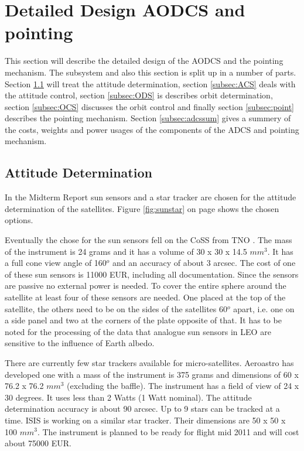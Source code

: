 \section{Detailed Design AODCS and pointing}
\label{sec:DDaodcs}
This section will describe the detailed design of the \ac{AODCS} and the pointing mechanism. The subsystem and also this section is split up in a number of parts. Section \ref{subsec:ADS} will treat the attitude determination, section \ref{subsec:ACS} deals with the attitude control, section \ref{subsec:ODS} is describes orbit determination, section \ref{subsec:OCS} discusses the orbit control and finally section \ref{subsec:point} describes the pointing mechanism. Section \ref{subsec:adcssum} gives a summery of the costs, weights and power usages of the components of the \ac{ADCS} and pointing mechanism.

\subsection{Attitude Determination}
\label{subsec:ADS}
In the Midterm Report \cite{midterm} sun sensors and a star tracker are chosen for the attitude determination of the satellites. Figure \ref{fig:sunstar} on page \pageref{fig:sunstar} shows the chosen options.

Eventually the chose for the sun sensors fell on the \ac{CoSS} from TNO \cite{tnoweb}. The mass of the instrument is 24 grams and it has a volume of 30 x 30 x 14.5 $mm^3$. It has a full cone view angle of 160${}^o$ and an accuracy of about 3 arcsec. The cost of one of these sun sensors is 11000 EUR, including all documentation. Since the sensors are passive no external power is needed. To cover the entire sphere around the satellite at least four of these sensors are needed. One placed at the top of the satellite, the others need to be on the sides of the satellites 60${}^o$ apart, i.e. one on a side panel and two at the corners of the plate opposite of that. It has to be noted for the processing of the data that analogue sun sensors in \ac{LEO} are sensitive to the influence of Earth albedo.

There are currently few star trackers available for micro-satellites. Aeroastro has developed one with a mass of the instrument is 375 grams and dimensions of 60 x 76.2 x 76.2 $mm^3$ (excluding the baffle). The instrument has a field of view of 24 x 30 degrees. It uses less than 2 Watts (1 Watt nominal). The attitude determination accuracy is about 90 arcsec. Up to 9 stars can be tracked at a time. ISIS \cite{cubesatshop} is working on a similar star tracker. Their dimensions are 50 x 50 x 100 $mm^3$. The instrument is planned to be ready for flight mid 2011 and will cost about 75000 EUR.

